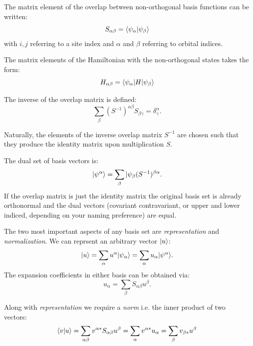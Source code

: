 The matrix element of the overlap between non-orthogonal 
basis functions can be written:
%
\begin{equation}
S_{\alpha\beta} = \langle \psi_{\alpha}|\psi_{\beta}\rangle
\end{equation}
%
with $i,j$ referring to a site index and $\alpha$ and $\beta$ 
referring to orbital indices.

The matrix elements of the Hamiltonian with the non-orthogonal states takes
the form:
%
\begin{equation}
H_{\alpha \beta} = \langle \psi_{\alpha}|H|\psi_{\beta}\rangle
\end{equation}

The inverse of the overlap matrix is defined:
%
\begin{equation}
\sum_{\beta}(S^{-1})^{\alpha\beta}S_{\beta\gamma}=\delta^{\alpha}_{\gamma}.
\end{equation}
%

Naturally, the elements of the inverse overlap matrix $S^{-1}$ are chosen 
such that they produce the identity matrix upon multiplication $S$.

The dual set of basis vectors is:
%
\begin{equation}
|\psi^{\alpha}\rangle = \sum_{\beta}|\psi_{\beta}(S^{-1})^{\beta\alpha}.
\end{equation}
%
If the overlap matrix is just the identity matrix the original 
basis set is already orthonormal and the dual vectors (covariant
contravariant, or upper and lower indiced, depending
on your naming preference) are equal.

The two most important aspects of any basis set
are {\it representation} and {\it normalization}. 
We can reprsent an arbitrary vector $|u\rangle$:
%
\begin{equation}
|u\rangle = \sum_{\alpha}u^{\alpha}|\psi_{\alpha}\rangle = \sum_{\alpha}u_{\alpha}|\psi^{\alpha}\rangle.
\end{equation}
%
The expansion coefficients in either basis can be obtained via:
%
\begin{equation}
u_{\alpha} = \sum_{\beta}S_{\alpha\beta}u^{\beta}.
\end{equation}
%

Along with {\it representation} we require a {\it norm} i.e. 
the inner product of two vectors:
%
\begin{equation}
\langle v|u \rangle = \sum_{\alpha\beta}v^{\alpha *}S_{\alpha\beta}u^{\beta} = \sum_{\alpha}v^{\alpha *}u_{\alpha} = \sum_{\beta}v_{\beta *}u^{\beta}
\end{equation}
%


